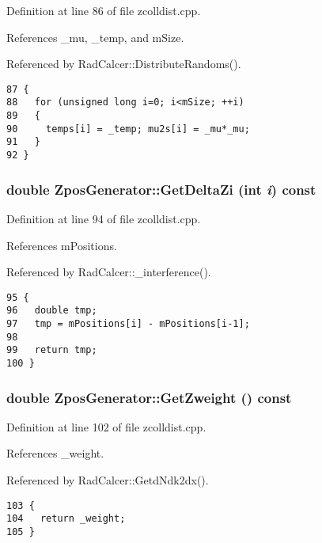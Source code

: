 Definition at line 86 of file zcolldist.cpp.

References \_\-mu, \_\-temp, and mSize.

Referenced by RadCalcer::DistributeRandoms().

\begin{Code}\begin{verbatim}87 {
88   for (unsigned long i=0; i<mSize; ++i)
89   {
90     temps[i] = _temp; mu2s[i] = _mu*_mu;
91   }
92 }
\end{verbatim}
\end{Code}


\subsubsection{\setlength{\rightskip}{0pt plus 5cm}double ZposGenerator::GetDeltaZi (int {\em i}) const}\label{classZposGenerator_ff9cfd493e73f5d711f755c496c462f0}




Definition at line 94 of file zcolldist.cpp.

References mPositions.

Referenced by RadCalcer::\_\-interference().

\begin{Code}\begin{verbatim}95 {
96   double tmp;
97   tmp = mPositions[i] - mPositions[i-1];
98   
99   return tmp;
100 }
\end{verbatim}
\end{Code}


\subsubsection{\setlength{\rightskip}{0pt plus 5cm}double ZposGenerator::GetZweight () const}\label{classZposGenerator_4efcf84343b79a423e7dc356fd9d0261}




Definition at line 102 of file zcolldist.cpp.

References \_\-weight.

Referenced by RadCalcer::GetdNdk2dx().

\begin{Code}\begin{verbatim}103 {
104   return _weight;
105 }
\end{verbatim}
\end{Code}




